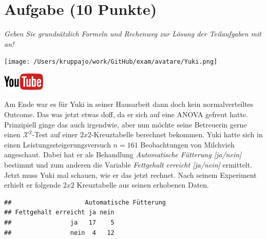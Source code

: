 \documentclass[a4paper, 9pt]{scrartcl}\usepackage[]{graphicx}\usepackage[]{xcolor}
\makeatletter
\newenvironment{kframe}{%
 \def\at@end@of@kframe{}%
 \ifinner\ifhmode%
  \def\at@end@of@kframe{\end{minipage}}%
  \begin{minipage}{\columnwidth}%
 \fi\fi%
 \def\FrameCommand##1{\hskip\@totalleftmargin \hskip-\fboxsep
 \colorbox{shadecolor}{##1}\hskip-\fboxsep
     \hskip-\linewidth \hskip-\@totalleftmargin \hskip\columnwidth}%
 \MakeFramed {\advance\hsize-\width
   \@totalleftmargin\z@ \linewidth\hsize
   \@setminipage}}%
 {\par\unskip\endMakeFramed%
 \at@end@of@kframe}
\newenvironment{knitrout}{}{} %
\makeatother
\begin{document}
\section{Aufgabe \hfill (10 Punkte)}

\textit{Geben Sie grundsätzlich Formeln und Rechenweg zur Lösung der Teilaufgaben mit an!} \\[1Ex]
 

 
\begin{minipage}[t]{0.5\textwidth}
\texttt{[image: /Users/kruppajo/work/GitHub/exam/avatare/Yuki.png]}
\end{minipage}
\begin{minipage}[t]{0.5\textwidth}
\hfill
\href{https://youtu.be/ghArbetOr_E}{\includegraphics[width = 2cm]{img/youtube}}\\[1Ex]
\end{minipage}
\vspace{1ex}



Am Ende war es für Yuki in seiner Hausarbeit dann doch kein normalverteiltes Outcome. Das was jetzt etwas doff, da er sich auf eine ANOVA gefreut hatte. Prinzipiell ginge das auch irgendwie, aber nun möchte seine Betreuerin gerne einen $\mathcal{X}^2$-Test auf einer $2x2$-Kreuztabelle berechnet bekommen. Yuki hatte sich in einen Leistungssteigerungsversuch $n = 161$ Beobachtungen von Milchvieh angeschaut. Dabei hat er als Behandlung \textit{Automatische Fütterung [ja/nein]} bestimmt und zum anderen die Variable \textit{Fettgehalt erreicht [ja/nein]} ermittelt. Jetzt muss Yuki mal schauen, wie er das jetzt rechnet. Nach seinem Experiment erhielt er folgende $2x2$ Kreuztabelle aus seinen erhobenen Daten.

\begin{knitrout}
\color{fgcolor}\begin{kframe}
\begin{verbatim}
##                    Automatische Fütterung
## Fettgehalt erreicht ja nein
##                ja   17    5
##                nein  4   12
\end{verbatim}
\end{kframe}
\end{knitrout}
\end{document}
